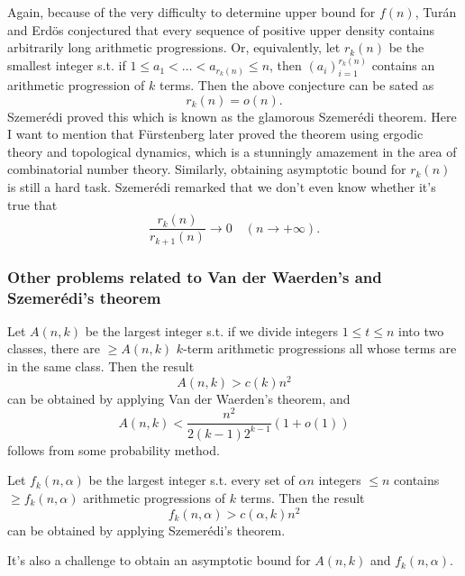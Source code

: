 \documentclass[12pt]{article}
\begin{document}
Again, because of the very difficulty to determine upper bound for $f(n)$, Tur\'{a}n and Erd\"{o}s\cite{erdosconj} conjectured that every sequence of positive upper density contains arbitrarily long arithmetic progressions. Or, equivalently, let $r_k(n)$ be the smallest integer s.t. if $1 \leq a_1 < \hdots < a_{r_k(n)} \leq n$, then $(a_i)_{i=1}^{r_k(n)}$ contains an arithmetic progression of $k$ terms. Then the above conjecture can be sated as 
\begin{equation}
r_k(n)=o(n).
\end{equation}
Szemer\'{e}di\cite{szpaper} proved this which is known as the glamorous Szemer\'{e}di theorem. Here I want to mention that F\"{u}rstenberg\cite{fur} later proved the theorem using ergodic theory and topological dynamics, which is a stunningly amazement in the area of combinatorial number theory. Similarly, obtaining asymptotic bound for $r_k(n)$ is still a hard task. Szemer\'{e}di remarked that we don't even know whether it's true that 
\begin{equation}
\frac{r_k(n)}{r_{k+1}(n)}\to 0 \quad (n \to +\infty).
\end{equation}

\subsubsection{Other problems related to Van der Waerden's and Szemer\'{e}di's theorem}

Let $A(n, k)$ be the largest integer s.t. if we divide integers $1 \leq t \leq n$ into two classes, there are $\geq A(n, k)$ $k$-term arithmetic progressions all whose terms are in the same class. Then the result 
\begin{equation}
A(n, k)>c(k)n^2
\end{equation}
can be obtained by applying Van der Waerden's theorem, and 
\begin{equation}
A(n, k) < \frac{n^2}{2(k-1)2^{k-1}}(1+o(1))
\end{equation}
follows from some probability method. 

Let $f_k(n, \alpha)$ be the largest integer s.t. every set of $\alpha n$ integers $\leq n$ contains $\geq f_k(n, \alpha)$ arithmetic progressions of $k$ terms. Then the result 
\begin{equation}
f_k(n, \alpha)>c(\alpha, k)n^2
\end{equation}
can be obtained by applying Szemer\'{e}di's theorem. 

It's also a challenge to obtain an asymptotic bound for $A(n, k)$ and $f_k(n, \alpha)$.
\end{document}
